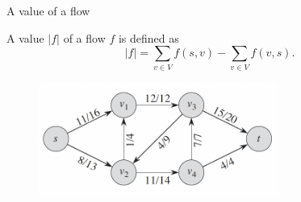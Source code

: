 \documentclass{beamer}
\begin{document}
\begin{frame}{A value of a flow}
    \small

    \begin{definition}
        A value $|f|$ of a flow $f$ is defined as
        \begin{equation}
            |f| = \sum_{v \in V} f(s, v) - \sum_{v \in V} f(v, s).
        \end{equation}
    \end{definition}


    \begin{figure}[H]
        \includegraphics[width=0.7\textwidth]{images/flow.png}
    \end{figure}
\end{frame}
\end{document}
